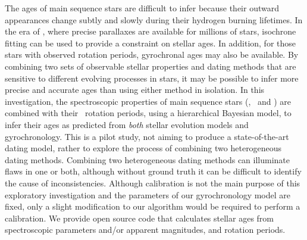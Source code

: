 
The ages of main sequence stars are difficult to infer because their outward
appearances change subtly and slowly during their hydrogen burning lifetimes.
In the era of \gaia, where precise parallaxes are available for millions of
stars, isochrone fitting can be used to provide a constraint on stellar ages.
In addition, for those stars with observed rotation periods, gyrochronal ages
may also be available.
By combining two sets of observable stellar properties and dating methods that
are sensitive to different evolving processes in stars, it may be possible to
infer more precise and accurate ages than using either method in isolation.
In this investigation, the spectroscopic properties of main sequence stars
(\teff, \feh\ and \logg) are combined with their \kepler\ rotation periods,
using a hierarchical Bayesian model, to infer their ages as predicted from {\it
both} stellar evolution models and gyrochronology.
This is a pilot study, not aiming to produce a state-of-the-art dating model,
rather to explore the process of combining two heterogeneous dating methods.
Combining two heterogeneous dating methods can illuminate flaws in one or
both, although without ground truth it can be difficult to identify the cause
of inconsistencies.
Although calibration is not the main purpose of this exploratory investigation
and the parameters of our gyrochronology model are fixed, only a slight
modification to our algorithm would be required to perform a calibration.
We provide open source code that calculates stellar ages from spectroscopic
parameters and/or apparent magnitudes, and rotation periods.




